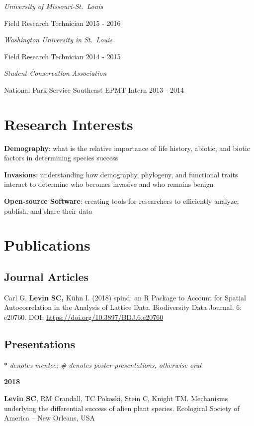 \documentclass[11pt,]{article}
\begin{document}
\emph{University of Missouri-St.~Louis}

Field Research Technician \hfill 2015 - 2016

\emph{Washington University in St.~Louis}

Field Research Technician \hfill 2014 - 2015

\emph{Student Conservation Association}

National Park Service Southeast EPMT Intern \hfill 2013 - 2014

\section{Research Interests}\label{research-interests}

\textbf{Demography}: what is the relative importance of life history,
abiotic, and biotic factors in determining species success

\textbf{Invasions}: understanding how demography, phylogeny, and
functional traits interact to determine who becomes invasive and who
remains benign

\textbf{Open-source Software}: creating tools for researchers to
efficiently analyze, publish, and share their data

\section{Publications}\label{publications}

\subsection{Journal Articles}\label{journal-articles}

Carl G, \textbf{Levin SC,} Kühn I. (2018) spind: an R Package to Account
for Spatial Autocorrelation in the Analysis of Lattice Data.
Biodiversity Data Journal. 6: e20760. DOI:
\url{https://doi.org/10.3897/BDJ.6.e20760}

\subsection{Presentations}\label{presentations}

\(\ast\) \emph{denotes mentee; \# denotes poster presentations,
otherwise oral}

\textbf{2018}

\textbf{Levin SC}, RM Crandall, TC Pokoski, Stein C, Knight TM.
Mechanisms underlying the differential success of alien plant species.
Ecological Society of America -- New Orleans, USA
\end{document}
